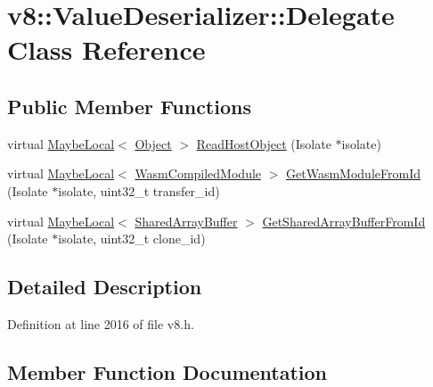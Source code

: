 \hypertarget{classv8_1_1ValueDeserializer_1_1Delegate}{}\section{v8\+:\+:Value\+Deserializer\+:\+:Delegate Class Reference}
\label{classv8_1_1ValueDeserializer_1_1Delegate}
\subsection*{Public Member Functions}
\begin{DoxyCompactItemize}
\item 
virtual \mbox{\hyperlink{classv8_1_1MaybeLocal}{Maybe\+Local}}$<$ \mbox{\hyperlink{classv8_1_1Object}{Object}} $>$ \mbox{\hyperlink{classv8_1_1ValueDeserializer_1_1Delegate_a8b06c19cba7e80c3c5271b0a2ca88a8a}{Read\+Host\+Object}} (Isolate $\ast$isolate)
\item 
virtual \mbox{\hyperlink{classv8_1_1MaybeLocal}{Maybe\+Local}}$<$ \mbox{\hyperlink{classv8_1_1WasmCompiledModule}{Wasm\+Compiled\+Module}} $>$ \mbox{\hyperlink{classv8_1_1ValueDeserializer_1_1Delegate_adcaa80ce590bbcfaac4929a9e7b49249}{Get\+Wasm\+Module\+From\+Id}} (Isolate $\ast$isolate, uint32\+\_\+t transfer\+\_\+id)
\item 
virtual \mbox{\hyperlink{classv8_1_1MaybeLocal}{Maybe\+Local}}$<$ \mbox{\hyperlink{classv8_1_1SharedArrayBuffer}{Shared\+Array\+Buffer}} $>$ \mbox{\hyperlink{classv8_1_1ValueDeserializer_1_1Delegate_a2b42c5b9a4a60bd614e0b343f6be31b5}{Get\+Shared\+Array\+Buffer\+From\+Id}} (Isolate $\ast$isolate, uint32\+\_\+t clone\+\_\+id)
\end{DoxyCompactItemize}


\subsection{Detailed Description}


Definition at line 2016 of file v8.\+h.



\subsection{Member Function Documentation}
\mbox{\label{classv8_1_1ValueDeserializer_1_1Delegate_a2b42c5b9a4a60bd614e0b343f6be31b5}} 
